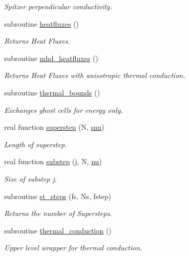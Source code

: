 \begin{DoxyCompactItemize}
\begin{DoxyCompactList}\small\item\em Spitzer perpendicular conductivity. \end{DoxyCompactList}\item 
subroutine \hyperlink{namespacethermal__cond_abc5c4fc622aea2f85fc5a0c2fee333bc}{heatfluxes} ()
\begin{DoxyCompactList}\small\item\em Returns Heat Fluxes. \end{DoxyCompactList}\item 
subroutine \hyperlink{namespacethermal__cond_aab43551b6a0d4b5894c07b510e4571d7}{mhd\+\_\+heatfluxes} ()
\begin{DoxyCompactList}\small\item\em Returns Heat Fluxes with anisotropic thermal conduction. \end{DoxyCompactList}\item 
subroutine \hyperlink{namespacethermal__cond_a55e65df0c700580f8af0a090063d2e32}{thermal\+\_\+bounds} ()
\begin{DoxyCompactList}\small\item\em Exchanges ghost cells for energy only. \end{DoxyCompactList}\item 
real function \hyperlink{namespacethermal__cond_a535cc1746914d413d4978aeda7b8fc06}{superstep} (N, \hyperlink{namespacethermal__cond_a53b14d15ce11990f6453a335c81d1728}{snu})
\begin{DoxyCompactList}\small\item\em Length of superstep. \end{DoxyCompactList}\item 
real function \hyperlink{namespacethermal__cond_a782aaba01217281f2aa57dcc955fd294}{substep} (j, N, \hyperlink{namespacethermal__cond_a38896e6bbd3b053ca066e407e4b3817f}{nu})
\begin{DoxyCompactList}\small\item\em Size of substep j. \end{DoxyCompactList}\item 
subroutine \hyperlink{namespacethermal__cond_a4c74dc0fd6a165d0fea419b560943701}{st\+\_\+steps} (fs, Ns, fstep)
\begin{DoxyCompactList}\small\item\em Returns the number of Supersteps. \end{DoxyCompactList}\item 
subroutine \hyperlink{namespacethermal__cond_a4b579df47b3bf4622a3ab51f57aa436b}{thermal\+\_\+conduction} ()
\begin{DoxyCompactList}\small\item\em Upper level wrapper for thermal conduction. \end{DoxyCompactList}\end{DoxyCompactItemize}
